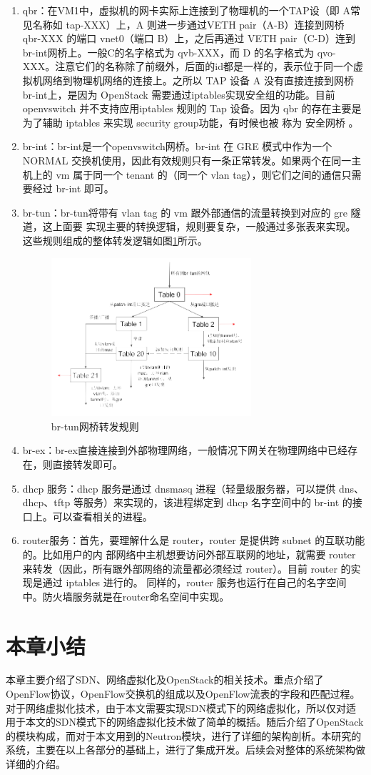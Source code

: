 \begin{enumerate}
\item qbr：在VM1中，虚拟机的网卡实际上连接到了物理机的一个TAP设（即 A常见名称如 tap-XXX）上，A 则进一步通过VETH pair（A-B）连接到网桥 qbr-XXX 的端口 vnet0（端口 B）上，之后再通过 VETH pair（C-D）连到br-int网桥上。一般C的名字格式为 qvb-XXX，而 D 的名字格式为 qvo-XXX。注意它们的名称除了前缀外，后面的id都是一样的，表示位于同一个虚拟机网络到物理机网络的连接上。之所以 TAP 设备 A 没有直接连接到网桥br-int上，是因为 OpenStack 需要通过iptables实现安全组的功能。目前 openvswitch 并不支持应用iptables 规则的 Tap 设备。因为 qbr 的存在主要是为了辅助 iptables 来实现 security group功能，有时候也被
称为 安全网桥 。
\item br-int：br-int是一个openvswitch网桥。br-int 在 GRE 模式中作为一个 NORMAL 交换机使用，因此有效规则只有一条正常转发。如果两个在同一主机上的 vm 属于同一个 tenant 的（同一个 vlan tag），则它们之间的通信只需要经过 br-int 即可。
\item br-tun：br-tun将带有 vlan tag 的 vm 跟外部通信的流量转换到对应的 gre 隧道，这上面要
实现主要的转换逻辑，规则要复杂，一般通过多张表来实现。这些规则组成的整体转发逻辑如图\ref{fig:br-tun}所示。

\begin{figure}[!htb]
  \centering
  \includegraphics[width=0.7\textwidth]{logo/br-tun.png}
  \caption{br-tun网桥转发规则}
  \label{fig:br-tun}
\end{figure}

\item br-ex：br-ex直接连接到外部物理网络，一般情况下网关在物理网络中已经存在，则直接转发即可。
\item dhcp 服务：dhcp 服务是通过 dnsmasq 进程（轻量级服务器，可以提供 dns、dhcp、tftp 等服务）来实现的，该进程绑定到 dhcp 名字空间中的 br-int 的接口上。可以查看相关的进程。
\item router服务：首先，要理解什么是 router，router 是提供跨 subnet 的互联功能的。比如用户的内
部网络中主机想要访问外部互联网的地址，就需要 router 来转发（因此，所有跟外部网络的流量都必须经过 router）。目前 router 的实现是通过 iptables 进行的。 同样的，router 服务也运行在自己的名字空间中。防火墙服务就是在router命名空间中实现。

\end{enumerate}

\section{本章小结}
本章主要介绍了SDN、网络虚拟化及OpenStack的相关技术。重点介绍了OpenFlow协议，OpenFlow交换机的组成以及OpenFlow流表的字段和匹配过程。对于网络虚拟化技术，由于本文需要实现SDN模式下的网络虚拟化，所以仅对适用于本文的SDN模式下的网络虚拟化技术做了简单的概括。随后介绍了OpenStack的模块构成，而对于本文用到的Neutron模块，进行了详细的架构剖析。本研究的系统，主要在以上各部分的基础上，进行了集成开发。后续会对整体的系统架构做详细的介绍。